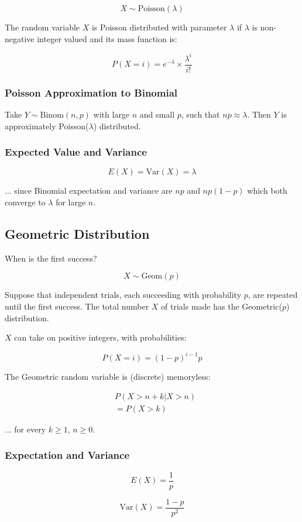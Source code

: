 $$ X \sim \text{Poisson}(\lambda) $$

The random variable $X$ is Poisson distributed with parameter $\lambda$ if $\lambda$ is non-negative integer valued and its mass function is:

$$ P(X = i) = e^{-\lambda} \times \frac{\lambda^i}{i!} $$

\subsubsection*{Poisson Approximation to Binomial}

Take $Y \sim \text{Binom}(n,p)$ with large $n$ and small $p$, such that $np \approx \lambda$. Then $Y$ is  approximately Poisson($\lambda$) distributed.

\subsubsection*{Expected Value and Variance}

$$ E(X) = \text{Var}(X) = \lambda $$

... since Binomial expectation and variance are $np$ and $np(1-p)$ which both converge to $\lambda$ for large $n$.

\subsection*{Geometric Distribution}

When is the first success?

$$ X \sim \text{Geom}(p) $$

Suppose that independent trials, each succeeding with probability $p$, are repeated until the first success. The total number $X$ of trials made has the Geometric($p$) distribution.

$X$ can take on positive integers, with probabilities:

$$ P(X = i) = (1-p)^{i-1} p $$

The Geometric random variable is (discrete) memoryless:

\begin{align*}
       & P(X > n + k | X > n) \\
       & = P(X > k)
\end{align*}

... for every $k \geq 1$, $n \geq 0$.

\subsubsection*{Expectation and Variance}

$$ E(X) = \frac{1}{p} $$

$$ \text{Var}(X) = \frac{1-p}{p^2} $$
